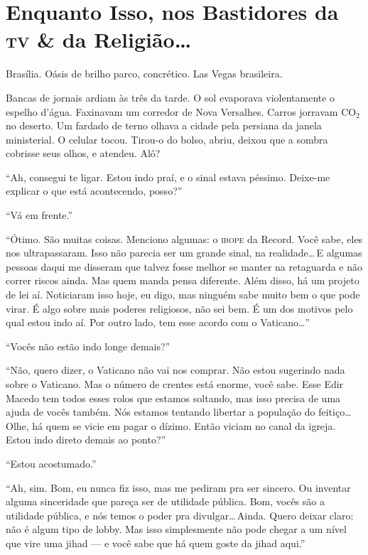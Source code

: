 \chapter[Nos Bastidores da \textsc{tv} e da Religião]{Enquanto Isso, nos Bastidores da \textsc{tv} \& da Religião\ldots}

Brasília. Oásis de brilho parco, concrético. Las Vegas brasileira.

Bancas de jornais ardiam às três da tarde. O sol evaporava violentamente o espelho d'água. Faxinavam um corredor de Nova Versalhes. Carros jorravam $\textrm{CO}_{2}$ no deserto. Um fardado de terno olhava a cidade pela persiana da janela ministerial. O celular tocou. Tirou-o do bolso, abriu, deixou que a sombra cobrisse seus olhos, e atendeu. Alô?

``Ah, consegui te ligar. Estou indo praí, e o sinal estava péssimo. Deixe-me explicar o que está acontecendo, posso?''

``Vá em frente.''

``Ótimo. São muitas coisas. Menciono algumas: o \textsc{ibope} da Record. Você sabe, eles nos ultrapassaram. Isso não parecia ser um grande sinal, na realidade\ldots\,E algumas pessoas daqui me disseram que talvez fosse melhor se manter na retaguarda e não correr riscos ainda. Mas quem manda pensa diferente. Além disso, há um projeto de lei aí. Noticiaram isso hoje, eu digo, mas ninguém sabe muito bem o que pode virar. É algo sobre mais poderes religiosos, não sei bem. É um dos motivos pelo qual estou indo aí. Por outro lado, tem esse acordo com o Vaticano\ldots''

``Vocês não estão indo longe demais?''

``Não, quero dizer, o Vaticano não vai nos comprar. Não estou sugerindo nada sobre o Vaticano. Mas o número de crentes está enorme, você sabe. Esse Edir Macedo tem todos esses rolos que estamos soltando, mas isso precisa de uma ajuda de vocês também. Nós estamos tentando libertar a população do feitiço\ldots\,Olhe, há quem se vicie em pagar o dízimo. Então viciam no canal da igreja. Estou indo direto demais ao ponto?''

``Estou acostumado.''

``Ah, sim. Bom, eu nunca fiz isso, mas me pediram pra ser sincero. Ou inventar alguma sinceridade que pareça ser de utilidade pública. Bom, vocês são a utilidade pública, e nós temos o poder pra divulgar\ldots\,Ainda. Quero deixar claro: não é algum tipo de lobby. Mas isso simplesmente não pode chegar a um nível que vire uma jihad --- e você sabe que há quem goste da jihad aqui.''


